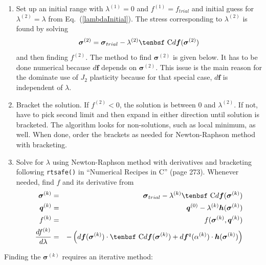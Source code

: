\documentclass[11pt]{book}
\renewcommand{\vec}[1]{\boldsymbol{#1}}
\def\C{\hbox{\tenbsf C}}
\def\df{d \vec{f}}
\def\dfq{d \vec{f}^q}
\begin{document}
\begin{enumerate}

\item Set up an initial range with $\lambda^{(1)}=0$ and $f^{(1)}=f_{trial}$ and initial guess for $\lambda^{(2)}=\lambda$ from Eq.~(\ref{lambdaInitial}). The stress corresponding to $\lambda^{(2)}$ is found by solving
\begin{equation}
      {\vec\sigma}^{(2)} = {\vec\sigma_{trial}} - \lambda^{(2)}\C\df({\vec\sigma}^{(2)})
\end{equation}
and then finding $f^{(2)}$. The method to find ${\vec\sigma}^{(2)}$ is given below. It has to be done numerical because $\df$ depends on ${\vec\sigma}^{(2)}$. This issue is the main reason for the dominate use of $J_2$ plasticity because for that special case, $\df$ is independent of $\lambda$.

\item Bracket the solution. If $f^{(2)}<0$, the solution is between 0 and $\lambda^{(2)}$. If not, have to pick second limit and then expand in either direction until solution is bracketed. The algorithm looks for non-solutions, such as local minimum, as well. When done, order the brackets as needed for Newton-Raphson method with bracketing.

\item Solve for $\lambda$ using Newton-Raphson method with derivatives and bracketing following {\tt rtsafe()} in ``Numerical Recipes in C'' (page 273). Whenever needed, find $f$ and its derivative from
\begin{eqnarray}
      {\vec\sigma}^{(k)} & = & {\vec\sigma_{trial}} - \lambda^{(k)}\C\df({\vec\sigma}^{(k)}) \\
      \vec q^{(k)} & = & \vec q^{(0)} - \lambda^{(k)} \vec h({\vec\sigma}^{(k)}) \\
      f^{(k)} & = &  f({\vec\sigma}^{(k)},\vec q^{(k)})  \\
      {df^{(k)}\over d\lambda} & = & -\left( \df({\vec\sigma}^{(k)})\cdot \C\df({\vec\sigma}^{(k)}) + \dfq(\alpha^{(k)}) \cdot \vec h({\vec\sigma}^{(k)})\right) 
\end{eqnarray}

\end{enumerate}

Finding the ${\vec\sigma}^{(k)}$ requires an iterative method:
\end{document}
